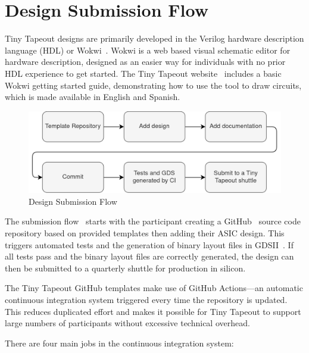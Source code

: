 \section{Design Submission Flow}
\label{sec:design_flow}

Tiny Tapeout designs are primarily developed in the Verilog hardware description language (HDL) or Wokwi~\cite{wokwi}.
Wokwi is a web based visual schematic editor for hardware description, designed as an easier way for individuals with no prior HDL experience to get started.
The Tiny Tapeout website~\cite{tinytapeout} includes a basic Wokwi getting started guide, demonstrating how to use the tool to draw circuits, which is made available in English and Spanish.

\begin{figure}[!t]
\centering
\includegraphics[width=\columnwidth]{./Figs/submission_flow.png}
\caption{Design Submission Flow}
\label{fig:submission_flow}
\end{figure}


The submission flow~\cite{submission_flow} starts with the participant creating a GitHub~\cite{github} source code repository based on provided templates then adding their ASIC design. This triggers automated tests and the generation of binary layout files in GDSII~\cite{gds}. If all tests pass and the binary layout files are correctly generated, the design can then be submitted to a quarterly shuttle for production in silicon.

The Tiny Tapeout GitHub templates\cite{verilogtemplate} make use of GitHub Actions\cite{githubactions}---an automatic continuous integration system triggered every time the repository is updated. This reduces duplicated effort and makes it possible for Tiny Tapeout to support large numbers of participants without excessive technical overhead.

There are four main jobs in the continuous integration system:

